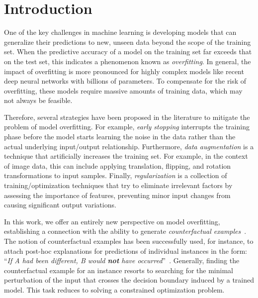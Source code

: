 \section{Introduction}
\label{sec:intro}
One of the key challenges in machine learning is developing models that can generalize their predictions to new, unseen data beyond the scope of the training set. 
When the predictive accuracy of a model on the training set far exceeds that on the test set, this indicates a phenomenon known as \textit{overfitting}.
In general, the impact of overfitting is more pronounced for highly complex models like recent deep neural networks with billions of parameters. 
To compensate for the risk of overfitting, these models require massive amounts of training data, which may not always be feasible. 


Therefore, several strategies have been proposed in the literature to mitigate the problem of model overfitting. For example, \textit{early stopping} interrupts the training phase before the model starts learning the noise in the data rather than the actual underlying input/output relationship.
Furthermore, \textit{data augmentation} is a technique that artificially increases the training set. For example, in the context of image data, this can include applying translation, flipping, and rotation transformations to input samples.
Finally, \textit{regularization} is a collection of training/optimization techniques that try to eliminate irrelevant factors by assessing the importance of features, preventing minor input changes from causing significant output variations.

In this work, we offer an entirely new perspective on model overfitting, establishing a connection with the ability to generate \textit{counterfactual examples}~\cite{wachter2017hjlt}. The notion of counterfactual examples has been successfully used, for instance, to attach post-hoc explanations for predictions of individual instances in the form: ``\textit{If A had been different, B would \textbf{not} have occurred}''~\citep{stepin2021survey}. 
Generally, finding the counterfactual example for an instance resorts to searching for the minimal perturbation of the input that crosses the decision boundary induced by a trained model. This task reduces to solving a constrained optimization problem.

